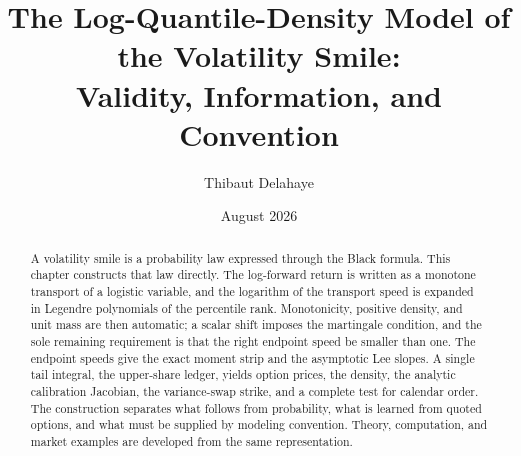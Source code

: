 \documentclass[11pt,a4paper]{article}
\title{\textbf{The Log-Quantile-Density Model of the Volatility Smile:\\
Validity, Information, and Convention}}
\author{Thibaut Delahaye}
\date{August 2026}
\theoremstyle{plain}
\theoremstyle{definition}
\theoremstyle{remark}
\newcommand{\1}{\mathbf{1}}
\begin{document}
\maketitle

\begin{abstract}
A volatility smile is a probability law expressed through the Black formula.
This chapter constructs that law directly.  The log-forward return is written
as a monotone transport of a logistic variable, and the logarithm of the
transport speed is expanded in Legendre polynomials of the percentile rank.
Monotonicity, positive density, and unit mass are then automatic; a scalar
shift imposes the martingale condition, and the sole remaining requirement is
that the right endpoint speed be smaller than one.  The endpoint speeds give
the exact moment strip and the asymptotic Lee slopes.  A single tail integral,
the upper-share ledger, yields option prices, the density, the analytic
calibration Jacobian, the variance-swap strike, and a complete test for
calendar order.  The construction separates what follows from probability,
what is learned from quoted options, and what must be supplied by modeling
convention.  Theory, computation, and market examples are developed from the
same representation.
\end{abstract}

\tableofcontents
\newpage










\appendix






\end{document}
